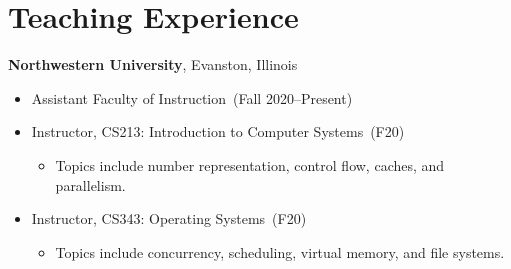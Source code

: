 \documentclass{article}
\begin{document}
\section*{Teaching Experience}
\vspace{-6pt}
{\bf Northwestern University}, Evanston, Illinois
\vspace{-6pt}
\begin{itemize}
  \item[] Assistant Faculty of Instruction~(Fall 2020--Present)
  \item[] Instructor, CS213: Introduction to Computer Systems~(F20)
    \vspace{-\topsep}
    \vspace{\itemsep}
    \begin{itemize}
      \item Topics include number representation, control flow, caches, and parallelism.
    \end{itemize}
  \item[] Instructor, CS343: Operating Systems~(F20)
    \vspace{-\topsep}
    \vspace{\itemsep}
    \begin{itemize}
      \item Topics include concurrency, scheduling, virtual memory, and file systems.
    \end{itemize}
\end{itemize}
\end{document}
